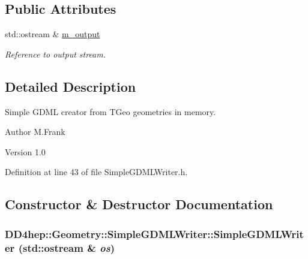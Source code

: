 \subsection*{Public Attributes}
\begin{DoxyCompactItemize}
\item 
std::ostream \& \hyperlink{class_d_d4hep_1_1_geometry_1_1_simple_g_d_m_l_writer_acfe610e807da01fe85b3e2bf5f94f428}{m\_\-output}
\begin{DoxyCompactList}\small\item\em Reference to output stream. \item\end{DoxyCompactList}\end{DoxyCompactItemize}


\subsection{Detailed Description}
Simple GDML creator from TGeo geometries in memory. \begin{DoxyAuthor}{Author}
M.Frank 
\end{DoxyAuthor}
\begin{DoxyVersion}{Version}
1.0 
\end{DoxyVersion}


Definition at line 43 of file SimpleGDMLWriter.h.

\subsection{Constructor \& Destructor Documentation}
\hypertarget{class_d_d4hep_1_1_geometry_1_1_simple_g_d_m_l_writer_a15eda8337c0e6b902ca91bd3cf5dd9a0}{
\subsubsection[{SimpleGDMLWriter}]{\setlength{\rightskip}{0pt plus 5cm}DD4hep::Geometry::SimpleGDMLWriter::SimpleGDMLWriter (std::ostream \& {\em os})}}
\label{class_d_d4hep_1_1_geometry_1_1_simple_g_d_m_l_writer_a15eda8337c0e6b902ca91bd3cf5dd9a0}


